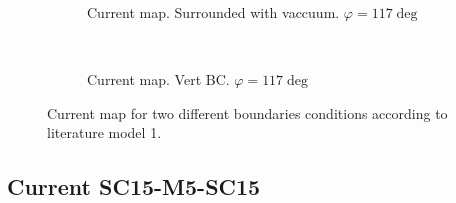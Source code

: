 \documentclass[../main.tex]{subfiles}
\begin{document}
\begin{figure}[H]
    \begin{subfigure}{0.4\textwidth}
        \centering
        
        \caption{Current map. Surrounded with vaccuum. $\varphi = 117 \deg$}
        \label{fig:first}
    \end{subfigure}\\
    \begin{subfigure}{0.4\textwidth}
        \centering
        
        \caption{Current map. Vert BC. $\varphi = 117 \deg$}
        \label{fig:first}
    \end{subfigure}
\caption{Current map for two different boundaries conditions according to literature model 1.}

\end{figure}

\subsection{Current SC15-M5-SC15}
\end{document}
